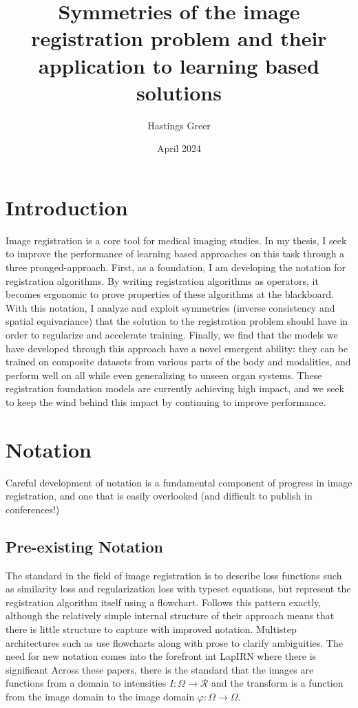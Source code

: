 \documentclass{article}
\title{Symmetries of the image registration problem and their application to learning based solutions}
\author{Hastings Greer }
\date{April 2024}
\begin{document}
\maketitle

\section{Introduction}

Image registration is a core tool for medical imaging studies. In my thesis, I
seek to improve the performance of learning based approaches on this task
through a three pronged-approach. First, as a foundation, I am developing the
notation for registration algorithms. By writing registration algorithms as
operators, it becomes ergonomic to prove properties of these algorithms at the
blackboard.
With this notation, I analyze and exploit symmetries (inverse consistency and spatial
equivariance) that the solution to the registration problem should have in
order to regularize and accelerate training. Finally, we find that the models we have developed through this approach have a novel emergent ability: they can be trained on composite datasets from various parts of the body and modalities, and perform well on all while even generalizing to unseen organ systems. These registration foundation models are currently achieving high impact, and we seek to keep the wind behind this impact by continuing to improve performance.

\section{Notation}

Careful development of notation is a fundamental component of progress in image
registration, and one that is easily overlooked (and difficult to publish in
conferences!)

\subsection{Pre-existing Notation}
The standard in the field of image registration is to describe loss functions
such as similarity loss and regularization loss with typeset equations, but
represent the registration algorithm itself using a flowchart.
\cite{balakrishnan2019voxelmorph} Follows this pattern exactly, although the
relatively simple internal structure of their approach means that there is
little structure to capture with improved notation. Multistep architectures
such as \cite{shen2019networks, mok2020large} use flowcharts along with prose
to clarify ambiguities. The need for new notation comes into the forefront int
LapIRN \cite{mok2020large} where there is significant Across these papers,
there is the standard that the images are functions from a domain to
intensities $I: \Omega \rightarrow \mathcal{R}$ and the transform is a function
from the image domain to the image domain $\varphi: \Omega \rightarrow \Omega$.
\end{document}
